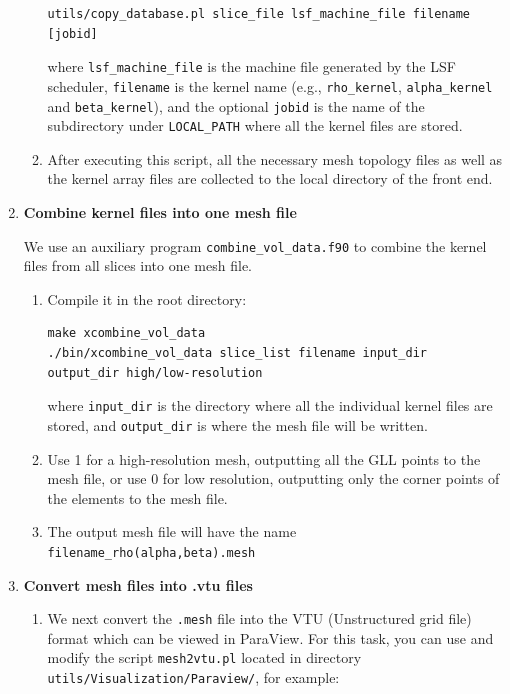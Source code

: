 \begin{enumerate}
\begin{enumerate}
{\small
\begin{verbatim}
utils/copy_database.pl slice_file lsf_machine_file filename [jobid]
\end{verbatim}
}
where \texttt{\small lsf\_machine\_file}{\small{} is the machine file
generated by the LSF scheduler, }\texttt{\small filename}{\small{}
is the kernel name (e.g., }\texttt{\small rho\_kernel}{\small , }\texttt{\small alpha\_kernel}{\small{}
and }\texttt{\small beta\_kernel}{\small ), and the optional }\texttt{\small jobid}{\small{}
is the name of the subdirectory under }\texttt{\small LOCAL\_PATH}{\small{}
where all the kernel files are stored.}{\small \par}

\item After executing this script, all the necessary mesh topology files
as well as the kernel array files are collected to the local directory
of the front end.
\end{enumerate}
\item \textbf{Combine kernel files into one mesh file}


We use an auxiliary program \texttt{combine\_vol\_data.f90} to combine
the kernel files from all slices into one mesh file.
\begin{enumerate}
\item Compile it in the root directory:
{\footnotesize
\begin{verbatim}
make xcombine_vol_data
./bin/xcombine_vol_data slice_list filename input_dir output_dir high/low-resolution
\end{verbatim}
}
where \texttt{input\_dir} is the directory where all the individual
kernel files are stored, and \texttt{output\_dir} is where the mesh
file will be written.

\item Use 1 for a high-resolution mesh, outputting all the GLL points to
the mesh file, or use 0 for low resolution, outputting only the corner
points of the elements to the mesh file.
\item The output mesh file will have the name \texttt{filename\_rho(alpha,beta).mesh}
\end{enumerate}

\item \textbf{Convert mesh files into .vtu files}

\begin{enumerate}
\item We next convert the \texttt{.mesh} file into the VTU (Unstructured
grid file) format which can be viewed in ParaView. For this task,
you can use and modify the script \texttt{mesh2vtu.pl} located in
directory \texttt{utils/Visualization/Paraview/}, for example:


\end{enumerate}
\end{enumerate}
